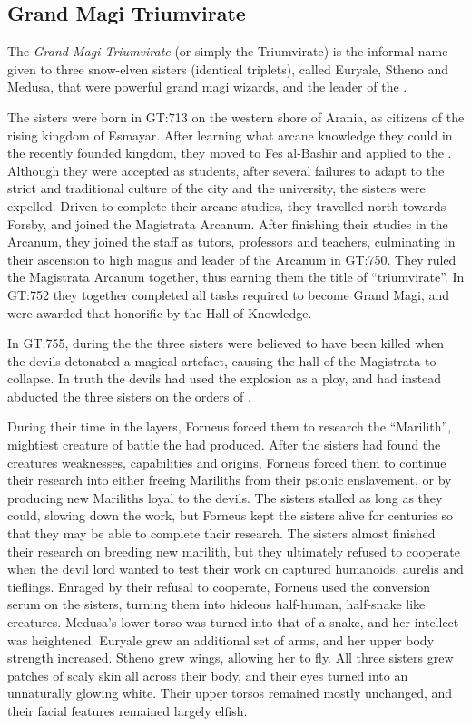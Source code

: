 \subsection{Grand Magi Triumvirate}
\label{sec:Triumvirate}

The \emph{Grand Magi Triumvirate} (or simply the Triumvirate) is the informal
name given to three snow-elven sisters (identical triplets), called Euryale,
Stheno and Medusa, that were powerful grand magi wizards, and the leader of the
.

The sisters were born in GT:713 on the western shore of Arania, as citizens of
the rising kingdom of Esmayar. After learning what arcane knowledge they could
in the recently founded kingdom, they moved to Fes al-Bashir and applied to the
. Although they were accepted as students, after
several failures to adapt to the strict and traditional culture of the city and
the university, the sisters were expelled. Driven to complete their arcane
studies, they travelled north towards Forsby, and joined the Magistrata
Arcanum. After finishing their studies in the Arcanum, they joined the staff
as tutors, professors and teachers, culminating in their ascension to high
magus and leader of the Arcanum in GT:750. They ruled the Magistrata Arcanum
together, thus earning them the title of ``triumvirate''. In GT:752 they
together completed all tasks required to become Grand Magi, and were awarded
that honorific by the Hall of Knowledge.

In GT:755, during the  the three sisters
were believed to have been killed when the devils detonated a magical
artefact, causing the hall of the Magistrata to collapse. In truth the devils
had used the explosion as a ploy, and had instead abducted the three sisters
on the orders of .

During their time in the layers, Forneus forced them to research the
``Marilith'', mightiest creature of battle the  had
produced. After the sisters had found the creatures weaknesses, capabilities
and origins, Forneus forced them to continue their research into either
freeing Mariliths from their psionic enslavement, or by producing new
Mariliths loyal to the devils. The sisters stalled as long as they could,
slowing down the work, but Forneus kept the sisters alive for centuries so
that they may be able to complete their research. The sisters almost finished
their research on breeding new marilith, but they ultimately refused to
cooperate when the devil lord wanted to test their work on captured humanoids,
aurelis and tieflings. Enraged by their refusal to cooperate, Forneus used the
conversion serum on the sisters, turning them into hideous half-human,
half-snake like creatures. Medusa's lower torso was turned into that of a
snake, and her intellect was heightened. Euryale grew an additional set of arms,
and her upper body strength increased. Stheno grew wings, allowing her to fly.
All three sisters grew patches of scaly skin all across their body, and their
eyes turned into an unnaturally glowing white. Their upper torsos remained
mostly unchanged, and their facial features remained largely elfish.

